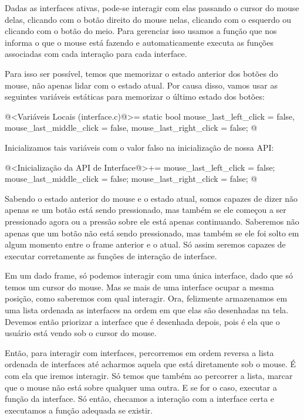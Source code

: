 
Dadas as interfaces ativas, pode-se interagir com elas passando o
cursor do mouse delas, clicando com o botão direito do mouse nelas,
clicando com o esquerdo ou clicando com o botão do meio. Para
gerenciar isso usamos a função  que
nos informa o que o mouse está fazendo e automaticamente executa as
funções associadas com cada interação para cada interface.

Para isso ser possível, temos que memorizar o estado anterior dos
botões do mouse, não apenas lidar com o estado atual. Por causa disso,
vamos usar as seguintes variáveis estáticas para memorizar o último
estado dos botões:

\iniciocodigo
@<Variáveis Locais (interface.c)@>=
static bool mouse_last_left_click = false, mouse_last_middle_click = false,
  mouse_last_right_click = false;
@
\fimcodigo

Inicializamos tais variáveis com o valor falso na inicialização de
nossa API:

\iniciocodigo
@<Inicialização da API de Interface@>+=
mouse_last_left_click = false;
mouse_last_middle_click = false;
mouse_last_right_click = false;
@
\fimcodigo

Sabendo o estado anterior do mouse e o estado atual, somos capazes de
dizer não apenas se um botão está sendo pressionado, mas também se ele
começou a ser pressionado agora ou a pressão sobre ele está apenas
continuando. Saberemos não apenas que um botão não está sendo
pressionado, mas também se ele foi solto em algum momento entre o
frame anterior e o atual. Só assim seremos capazes de executar
corretamente as funções de interação de interface.

Em um dado frame, só podemos interagir com uma única interface, dado
que só temos um cursor do mouse. Mas se mais de uma interface ocupar a
mesma posição, como saberemos com qual interagir. Ora, felizmente
armazenamos em uma lista ordenada as interfaces na ordem em que elas
são desenhadas na tela. Devemos então priorizar a interface que é
desenhada depois, pois é ela que o usuário está vendo sob o cursor do
mouse.

Então, para interagir com interfaces, percorremos em ordem reversa a
lista ordenada de interfaces até acharmos aquela que está diretamente
sob o mouse. É com ela que iremos interagir. Só temos que também ao
percorrer a lista, marcar que o mouse não está sobre qualquer uma
outra. E se for o caso, executar a função  da
interface. Só então, checamos a interação com a interface certa e
executamos a função adequada se existir.

